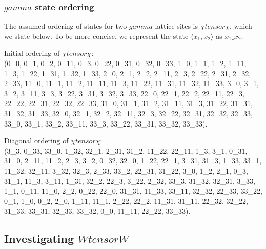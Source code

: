 \documentclass[10pt,a4paper]{amsart}
\numberwithin{equation}{section}
\theoremstyle{definition}
\def\boldsymbol#1{#1}
\def\gamma{gamma}
\def\otimes{ tensor }
\begin{document}
\subsubsection[gamma state ordering]{$\boldsymbol{\gamma}$ state ordering}
The assumed ordering of states for two $\gamma$-lattice sites is $\chi \otimes \chi$, which we state below. To be more concise, we represent the state $\langle x_1,x_2 \rangle$ as $x_1\_x_2$.

Initial ordering of $\chi \otimes \chi$:\\
(0\_0, 0\_1, 0\_2, 0\_11, 0\_3, 0\_22, 0\_31, 0\_32, 0\_33, 1\_0, 1\_1, 1\_2, 1\_11, 1\_3, 1\_22, 1\_31, 1\_32, 1\_33, 2\_0, 2\_1, 2\_2, 2\_11, 2\_3, 2\_22, 2\_31, 2\_32, 2\_33, 11\_0, 11\_1, 11\_2, 11\_11, 11\_3, 11\_22, 11\_31, 11\_32, 11\_33, 3\_0, 3\_1, 3\_2, 3\_11, 3\_3, 3\_22, 3\_31, 3\_32, 3\_33, 22\_0, 22\_1, 22\_2, 22\_11, 22\_3, 22\_22, 22\_31, 22\_32, 22\_33, 31\_0, 31\_1, 31\_2, 31\_11, 31\_3, 31\_22, 31\_31, 31\_32, 31\_33, 32\_0, 32\_1, 32\_2, 32\_11, 32\_3, 32\_22, 32\_31, 32\_32, 32\_33, 33\_0, 33\_1, 33\_2, 33\_11, 33\_3, 33\_22, 33\_31, 33\_32, 33\_33).

Diagonal ordering of $\chi \otimes \chi$:\\
 (3\_3, 0\_33, 33\_0, 1\_32, 32\_1, 2\_31, 31\_2, 11\_22, 22\_11, 1\_3, 3\_1, 0\_31, 31\_0, 2\_11, 11\_2, 2\_3, 3\_2, 0\_32, 32\_0, 1\_22, 22\_1, 3\_31, 31\_3, 1\_33, 33\_1, 11\_32, 32\_11, 3\_32, 32\_3, 2\_33, 33\_2, 22\_31, 31\_22, 3\_0, 1\_2, 2\_1, 0\_3, 31\_1, 11\_3, 3\_11, 1\_31, 32\_2, 22\_3, 3\_22, 2\_32, 33\_3, 31\_32, 32\_31, 3\_33, 1\_1, 0\_11, 11\_0, 2\_2, 0\_22, 22\_0, 31\_31, 11\_33, 33\_11, 32\_32, 22\_33, 33\_22, 0\_1, 1\_0, 0\_2, 2\_0, 1\_11, 11\_1, 2\_22, 22\_2, 11\_31, 31\_11, 22\_32, 32\_22, 31\_33, 33\_31, 32\_33, 33\_32, 0\_0, 11\_11, 22\_22, 33\_33).

\subsection[Investigating W tensor W]{Investigating $\boldsymbol{W\otimes W}$}
\end{document}
